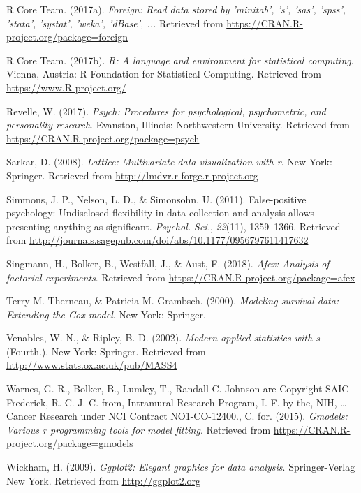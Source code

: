 \documentclass[english,man]{apa6}
\theoremstyle{definition}
\theoremstyle{definition}
\theoremstyle{definition}
\theoremstyle{remark}
\begin{document}
\hypertarget{ref-R-foreign}{}
R Core Team. (2017a). \emph{Foreign: Read data stored by 'minitab', 's',
'sas', 'spss', 'stata', 'systat', 'weka', 'dBase', ...} Retrieved from
\url{https://CRAN.R-project.org/package=foreign}

\hypertarget{ref-R-base}{}
R Core Team. (2017b). \emph{R: A language and environment for
statistical computing}. Vienna, Austria: R Foundation for Statistical
Computing. Retrieved from \url{https://www.R-project.org/}

\hypertarget{ref-R-psych}{}
Revelle, W. (2017). \emph{Psych: Procedures for psychological,
psychometric, and personality research}. Evanston, Illinois:
Northwestern University. Retrieved from
\url{https://CRAN.R-project.org/package=psych}

\hypertarget{ref-R-lattice}{}
Sarkar, D. (2008). \emph{Lattice: Multivariate data visualization with
r}. New York: Springer. Retrieved from
\url{http://lmdvr.r-forge.r-project.org}

\hypertarget{ref-Simmons2011-za}{}
Simmons, J. P., Nelson, L. D., \& Simonsohn, U. (2011). False-positive
psychology: Undisclosed flexibility in data collection and analysis
allows presenting anything as significant. \emph{Psychol. Sci.},
\emph{22}(11), 1359--1366. Retrieved from
\url{http://journals.sagepub.com/doi/abs/10.1177/0956797611417632}

\hypertarget{ref-R-afex}{}
Singmann, H., Bolker, B., Westfall, J., \& Aust, F. (2018). \emph{Afex:
Analysis of factorial experiments}. Retrieved from
\url{https://CRAN.R-project.org/package=afex}

\hypertarget{ref-R-survival-book}{}
Terry M. Therneau, \& Patricia M. Grambsch. (2000). \emph{Modeling
survival data: Extending the Cox model}. New York: Springer.

\hypertarget{ref-R-MASS}{}
Venables, W. N., \& Ripley, B. D. (2002). \emph{Modern applied
statistics with s} (Fourth.). New York: Springer. Retrieved from
\url{http://www.stats.ox.ac.uk/pub/MASS4}

\hypertarget{ref-R-gmodels}{}
Warnes, G. R., Bolker, B., Lumley, T., Randall C. Johnson are Copyright
SAIC-Frederick, R. C. J. C. from, Intramural Research Program, I. F. by
the, NIH, \ldots{} Cancer Research under NCI Contract NO1-CO-12400., C.
for. (2015). \emph{Gmodels: Various r programming tools for model
fitting}. Retrieved from
\url{https://CRAN.R-project.org/package=gmodels}

\hypertarget{ref-R-ggplot2}{}
Wickham, H. (2009). \emph{Ggplot2: Elegant graphics for data analysis}.
Springer-Verlag New York. Retrieved from \url{http://ggplot2.org}
\end{document}
